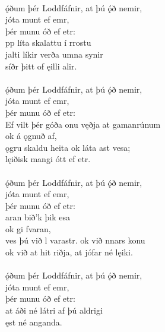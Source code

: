  \\

\bva {}ǫ́ðum þér Loddfáfnir, \hld at þú ǫ́ð nemir, \\%
\ind {}jóta munt ef emr, \\%
\ind þér munu óð ef etr: \\%
pp líta \hld skalattu í rrostu \\%
jalti líkir \hld verða umna synir \\%
\ind síðr þitt of ęilli alir.\\%

 \\

\bva {}ǫ́ðum þér Loddfáfnir, \hld at þú ǫ́ð nemir, \\%
\ind {}jóta munt ef emr, \\%
\ind þér munu óð ef etr: \\%
Ef vilt þér góða onu \hld {}vęðja at gamanrúnum \\%
\ind ok á ǫgnuð af, \\%
ǫgru skaldu heita \hld ok láta ast vesa; \\%
\ind lęiðisk mangi ótt ef etr.\\%

 \\

\bva {}ǫ́ðum þér Loddfáfnir, \hld at þú ǫ́ð nemir, \\%
\ind {}jóta munt ef emr, \\%
\ind þér munu óð ef etr: \\%
\ind {}aran bið'k þik esa \\%
\ind ok gi fvaran, \\%
ves þú við l varastr. \hld ok við nnars konu \\%
ok við at hit riðja, \hld at jófar né lęiki.\\%

 \\

\bva {}ǫ́ðum þér Loddfáfnir, \hld at þú ǫ́ð nemir, \\%
\ind {}jóta munt ef emr, \\%
\ind þér munu óð ef etr: \\%
at áði né látri \hld {}af þú aldrigi \\%
\ind {}ęst né anganda.\\%

